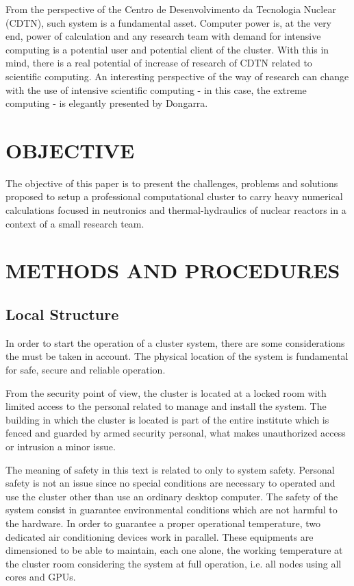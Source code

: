 \documentclass[twoside,a4paper,12pt,english]{inac17}
\begin{document}
From the perspective of the Centro de Desenvolvimento da Tecnologia Nuclear (CDTN), such system
is a fundamental asset. Computer power is, at the very end, power of calculation and any research
team with demand for intensive computing is a potential user and potential client of the cluster.
With this in mind, there is a real potential of increase of research of CDTN related to
scientific computing. An interesting perspective of the way of research can change with the
use of intensive scientific computing - in this case, the extreme computing - is elegantly
presented by Dongarra\cite{Dongarra2017}.

\section{OBJECTIVE}

The objective of this paper is to present the challenges, problems and solutions proposed
to setup a professional computational cluster to carry heavy numerical calculations focused in
neutronics and thermal-hydraulics of nuclear reactors in a
context of a small research team.

\section{METHODS AND PROCEDURES}

\subsection{Local Structure}

In order to start the operation of a cluster system, there are some considerations the must
be taken in account. The physical location of the system is fundamental for safe, secure and
reliable operation.

From the security point of view, the cluster is located at a locked room with limited access to
the personal related to manage and install the system. The building in which the cluster is located
is part of the entire institute which is fenced and guarded by armed security personal, what makes
unauthorized access or intrusion a minor issue.

The meaning of safety in this text is related to only to system safety. Personal
safety is not an issue since no special conditions are necessary to operated and use the cluster other
than use an ordinary desktop computer. The safety of the system consist in guarantee environmental conditions
which are not harmful to the hardware. In order to guarantee a proper operational temperature, two dedicated
air conditioning devices work in parallel. These equipments are dimensioned to be able to maintain, each one alone,
the working temperature at the cluster room considering the system at full operation, i.e. all nodes using all cores
and GPUs.
\end{document}
